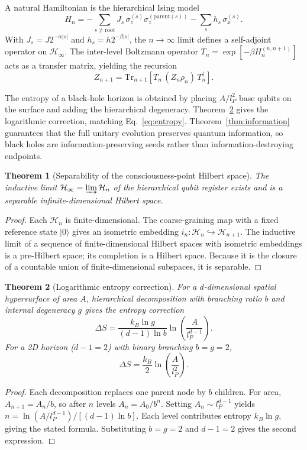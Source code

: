 \documentclass[11pt,a4paper]{article}
\theoremstyle{plain}
\newtheorem{theorem}{Theorem}
\begin{document}
A natural Hamiltonian is the hierarchical Ising model
\begin{equation}\label{eq:hamiltonian}
H_n=-\sum_{s\neq\mathrm{root}} J_s\,\sigma_z^{(s)}\sigma_z^{(\mathrm{parent}(s))}
-\sum_s h_s\,\sigma_x^{(s)}.
\end{equation}
With $J_s=J2^{-\alpha|s|}$ and $h_s=h2^{-\beta|s|}$, the $n\to\infty$ limit defines a self-adjoint operator on $\mathcal{H}_\infty$. The inter-level Boltzmann operator $T_n=\exp[-\beta H_n^{(n,n+1)}]$ acts as a transfer matrix, yielding the recursion
\begin{equation}\label{eq:transfer}
Z_{n+1}=\mathrm{Tr}_{n+1}\!\left[T_n\,(Z_n\rho_n)\,T_n^\dagger\right].
\end{equation}

The entropy of a black-hole horizon is obtained by placing $A/l_P^2$ base qubits on the surface and adding the hierarchical degeneracy. Theorem~\ref{thm:entropy} gives the logarithmic correction, matching Eq.~\eqref{eq:entropy}. Theorem~\ref{thm:information} guarantees that the full unitary evolution preserves quantum information, so black holes are information-preserving seeds rather than information-destroying endpoints.

\begin{theorem}[Separability of the consciousness-point Hilbert space]\label{thm:separable}
The inductive limit $\mathcal{H}_\infty=\varinjlim\mathcal{H}_n$ of the hierarchical qubit register exists and is a separable infinite-dimensional Hilbert space.
\end{theorem}
\begin{proof}
Each $\mathcal{H}_n$ is finite-dimensional. The coarse-graining map with a fixed reference state $|0\rangle$ gives an isometric embedding $i_n:\mathcal{H}_n\hookrightarrow\mathcal{H}_{n+1}$. The inductive limit of a sequence of finite-dimensional Hilbert spaces with isometric embeddings is a pre-Hilbert space; its completion is a Hilbert space. Because it is the closure of a countable union of finite-dimensional subspaces, it is separable.
\end{proof}

\begin{theorem}[Logarithmic entropy correction]\label{thm:entropy}
For a $d$-dimensional spatial hypersurface of area $A$, hierarchical decomposition with branching ratio $b$ and internal degeneracy $g$ gives the entropy correction
\[
\Delta S=\frac{k_B\ln g}{(d-1)\ln b}\ln\!\left(\frac{A}{l_P^{d-1}}\right).
\]
For a 2D horizon ($d-1=2$) with binary branching $b=g=2$,
\[
\Delta S=\frac{k_B}{2}\ln\!\left(\frac{A}{l_P^2}\right).
\]
\end{theorem}
\begin{proof}
Each decomposition replaces one parent node by $b$ children. For area, $A_{n+1}=A_n/b$, so after $n$ levels $A_n=A_0/b^n$. Setting $A_n\sim l_P^{d-1}$ yields $n=\ln(A/l_P^{d-1})/[(d-1)\ln b]$. Each level contributes entropy $k_B\ln g$, giving the stated formula. Substituting $b=g=2$ and $d-1=2$ gives the second expression.
\end{proof}
\end{document}
